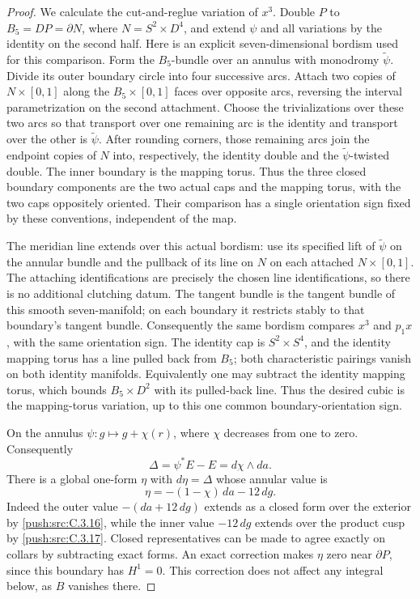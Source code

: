 \begin{proof}
We calculate the cut-and-reglue variation of $x^3$. Double $P$
to $B_5=DP=\partial N$, where $N=S^2\times D^4$, and extend
$\psi$ and all variations by the identity on the second half.
Here is an explicit seven-dimensional bordism used for this
comparison. Form the $B_5$-bundle over an annulus with monodromy
$\widetilde\psi$. Divide its outer boundary circle into four
successive arcs. Attach two copies of $N\times[0,1]$ along the
$B_5\times[0,1]$ faces over opposite arcs, reversing the interval
parametrization on the second attachment. Choose the
trivializations over these two arcs so that transport over one
remaining arc is the identity and transport over the other is
$\widetilde\psi$. After rounding corners, those remaining arcs
join the endpoint copies of $N$ into, respectively, the identity
double and the $\widetilde\psi$-twisted double. The inner boundary
is the mapping torus. Thus the three closed boundary components
are the two actual caps and the mapping torus, with the two caps
oppositely oriented. Their comparison has a single orientation
sign fixed by these conventions, independent of the map.

The meridian line extends over this actual bordism: use its
specified lift of $\widetilde\psi$ on the annular bundle and
the pullback of its line on $N$ on each attached $N\times[0,1]$.
The attaching identifications are precisely the chosen line
identifications, so there is no additional clutching datum.
The tangent bundle is the tangent bundle of this smooth
seven-manifold; on each boundary it restricts stably to that
boundary's tangent bundle. Consequently the same bordism
compares $x^3$ and $p_1x$, with the same orientation sign.
The identity cap is $S^2\times S^4$, and the identity mapping
torus has a line pulled back from $B_5$; both characteristic
pairings vanish on both identity manifolds. Equivalently one
may subtract the identity mapping torus, which bounds
$B_5\times D^2$ with its pulled-back line. Thus the desired
cubic is the mapping-torus variation, up to this one common
boundary-orientation sign.

On the annulus $\psi:g\mapsto g+\chi(r)$, where $\chi$ decreases
from one to zero. Consequently
\[
 \Delta=\psi^*E-E=d\chi\wedge da.
\]
There is a global one-form $\eta$ with $d\eta=\Delta$ whose
annular value is
\[
 \eta=-(1-\chi)\,da-12\,dg.
\]
Indeed the outer value $-(da+12\,dg)$ extends as a closed form
over the exterior by \ref{push:src:C.3.16}, while the inner value $-12\,dg$
extends over the product cusp by \ref{push:src:C.3.17}. Closed representatives
can be made to agree exactly on collars by subtracting exact
forms. An exact correction makes $\eta$ zero near $\partial P$,
since this boundary has $H^1=0$. This correction does not affect
any integral below, as $B$ vanishes there.


\end{proof}
